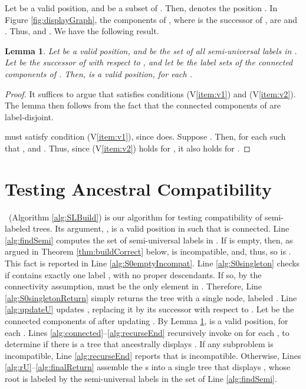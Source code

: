 \documentclass[11pt]{article}
\newtheorem{lemma}{Lemma}
\theoremstyle{definition}
\begin{document}
Let  be a valid position, and  be a subset of .  Then,  denotes the position .
In Figure \ref{fig:displayGraph}, the components of , where  is the successor of , are  and .  Thus,  and .  We have the following result.

\begin{lemma}\label{lm:childOfU}
Let  be a valid position, and  be the set of all semi-universal labels in .  Let  be the successor of  with respect to , and let  be the label sets of the connected components of .  Then,  is a valid position, for each . 
\end{lemma}

\begin{proof}
It suffices to argue that  satisfies conditions (V\ref{item:v1}) and  (V\ref{item:v2}).  The lemma then follows from  the fact that the connected components of  are label-disjoint.

 must satisfy condition (V\ref{item:v1}), since  does. Suppose .  Then, for each  such that ,  and .  Thus, since (V\ref{item:v2}) holds for , it also holds for .
\end{proof}


\section{Testing Ancestral Compatibility}\label{sec:testAC}

\SLBuild\ (Algorithm \ref{alg:SLBuild}) is our algorithm for testing compatibility of semi-labeled trees.  Its argument, , is a valid position in  such that  is connected.  Line \ref{alg:findSemi} computes the set  of semi-universal labels in .  If  is empty, then, as argued in Theorem \ref{thm:buildCorrect} below,  is incompatible, and, thus, so is .  This fact is reported in Line \ref{alg:S0emptyIncompat}.  Line \ref{alg:S0singleton} checks if  contains exactly one label , with no proper descendants.  If so, by the connectivity assumption,  must be the only element in .  Therefore, Line \ref{alg:S0singletonReturn} simply returns the tree with a single node, labeled . Line \ref{alg:updateU} updates , replacing it by its successor with respect to .  Let  be the connected components of  after updating .
By Lemma \ref{lm:childOfU},  is a valid position, for each . 
Lines \ref{alg:connected}--\ref{alg:recurseEnd} recursively invoke  on   for each , to determine if there is a tree  that ancestrally displays .  If any subproblem is incompatible, Line \ref{alg:recurseEnd} reports that  is incompatible.  Otherwise, Lines \ref{alg:rU}--\ref{alg:finalReturn} assemble the s into a single tree that displays , whose root is labeled by the semi-universal labels in the set  of Line \ref{alg:findSemi}.
\end{document}

